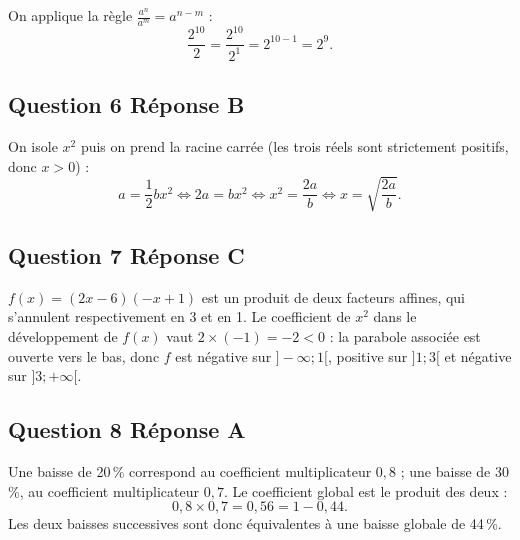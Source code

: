 \documentclass[10pt]{article}
\begin{document}
On applique la règle $\frac{a^n}{a^m}=a^{n-m}$ :
\[\dfrac{2^{10}}{2} = \dfrac{2^{10}}{2^1} = 2^{10-1} = 2^9.\]

\subsection*{Question 6 \quad Réponse B}

On isole $x^2$ puis on prend la racine carrée (les trois réels sont strictement positifs,
donc $x > 0$) :
\[a = \dfrac{1}{2}bx^2 \iff 2a = bx^2 \iff x^2 = \dfrac{2a}{b} \iff x = \sqrt{\dfrac{2a}{b}}.\]

\subsection*{Question 7 \quad Réponse C}

$f(x) = (2x-6)(-x+1)$ est un produit de deux facteurs affines, qui s'annulent respectivement
en 3 et en 1. Le coefficient de $x^2$ dans le développement de $f(x)$ vaut
$2 \times (-1) = -2 < 0$ : la parabole associée est ouverte vers le bas, donc $f$ est
négative sur $]-\infty ; 1[$, positive sur $]1 ; 3[$ et négative sur $]3 ; +\infty[$.

\subsection*{Question 8 \quad Réponse A}

Une baisse de 20\,\% correspond au coefficient multiplicateur $0,8$ ; une baisse de
30\,\%, au coefficient multiplicateur $0,7$. Le coefficient global est le produit
des deux :
\[0,8 \times 0,7 = 0,56 = 1 - 0,44.\]
Les deux baisses successives sont donc équivalentes à une baisse globale de 44\,\%.
\end{document}
